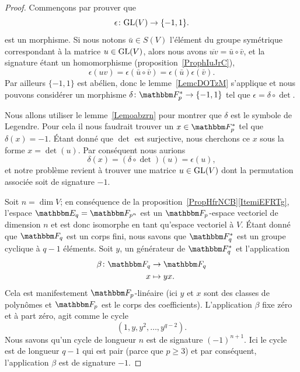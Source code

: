\begin{proof}
    Commençons par prouver que
    \begin{equation}
        \epsilon\colon \textup{GL}(V)\to \{ -1,1 \}.
    \end{equation}
    est un morphisme. Si nous notons \( \bar u\in S(V)\) l'élément du groupe symétrique correspondant à la matrice \( u\in \textup{GL}(V)\), alors nous avons \( \overline{ uv }=\bar u\circ\bar v\), et la signature étant un homomorphisme (proposition~\ref{ProphIuJrC}),
    \begin{equation}
        \epsilon(uv)=\epsilon(\bar u\circ\bar v)=\epsilon(\bar u)\epsilon(\bar v).
    \end{equation}
    Par ailleurs \( \{ -1,1 \}\) est abélien, donc le lemme~\ref{LemcDOTzM} s'applique et nous pouvons considérer un morphisme \( \delta\colon \eF_p^*\to \{ -1,1 \}\) tel que \( \epsilon=\delta\circ\det\).

    Nous allons utiliser le lemme~\ref{Lemoabzrn} pour montrer que \( \delta\) est le symbole de Legendre. Pour cela il nous faudrait trouver un \( x\in \eF_p^*\) tel que \( \delta(x)=-1\). Étant donné que \( \det\) est surjective, nous cherchons ce \( x\) sous la forme \( x=\det(u)\). Par conséquent nous aurions
    \begin{equation}
        \delta(x)=(\delta\circ\det)(u)=\epsilon(u),
    \end{equation}
    et notre problème revient à trouver une matrice \( u\in\textup{GL}(V)\) dont la permutation associée soit de signature \( -1\).

    Soit \( n=\dim V\); en conséquence de la proposition~\ref{PropHfrNCB}\ref{ItemiEFRTg}, l'espace \( \eE_q=\eF_{p^n}\) est un \( \eF_p\)-espace vectoriel de dimension \( n\) et est donc isomorphe en tant qu'espace vectoriel à \( V\). Étant donné que \( \eF_q\) est un corps fini, nous savons que \( \eF_q^*\) est un groupe cyclique à \( q-1\) éléments. Soit \( y\), un générateur de \( \eF_q^*\) et l'application
    \begin{equation}
        \begin{aligned}
            \beta\colon \eF_q&\to \eF_q \\
            x&\mapsto yx.
        \end{aligned}
    \end{equation}
    Cela est manifestement \( \eF_p\)-linéaire (ici \( y\) et \( x\) sont des classes de polynômes et \( \eF_p\) est le corps des coefficients). L'application \( \beta\) fixe zéro et à part zéro, agit comme le cycle
    \begin{equation}
        (1,y,y^2,\ldots, y^{q-2}).
    \end{equation}
    Nous savons qu'un cycle de longueur \( n\) est de signature \( (-1)^{n+1}\). Ici le cycle est de longueur \( q-1\) qui est pair (parce que \( p\geq 3\)) et par conséquent, l'application \( \beta\) est de signature \( -1\).
\end{proof}

